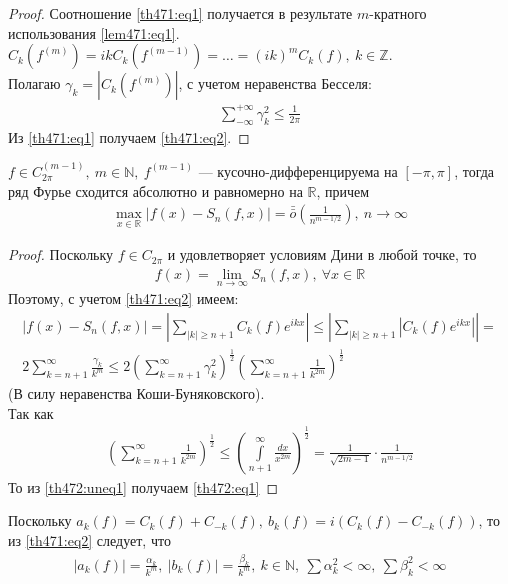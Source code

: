\begin{proof}
  Соотношение \eqref{th471:eq1} получается в результате $m$-кратного
  использования \eqref{lem471:eq1}. \\
  $C_k(f^{(m)}) = ik C_k(f^{(m-1)}) = \dots = (ik)^m C_k(f), \ k \in
  \mathbb{Z}$. \\
  Полагаю $\gamma_k = |C_k(f^{(m)})|$, с учетом неравенства Бесселя:
  \begin{gather*}
    \sum\limits_{-\infty}^{+\infty} \gamma_k^2 \leq \frac{1}{2\pi}
  \end{gather*}
  Из \eqref{th471:eq1} получаем \eqref{th471:eq2}.
\end{proof}

\begin{theorem}
  $f \in C_{2\pi}^{(m-1)}, \ m \in \mathbb{N}, \ f^{(m-1)}$ ---
  кусочно-дифференцируема на $[-\pi, \pi]$, тогда ряд Фурье сходится абсолютно
  и равномерно на $\mathbb{R}$, причем
  \begin{gather}
    \max\limits_{x \in \mathbb{R}} |f(x) - S_n(f,x)| =
    \bar{\bar{o}}\left(\frac{1}{n^{m - 1/2}}\right), \ n \to \infty
    \label{th472:eq1}
  \end{gather}
\end{theorem}

\begin{proof}
  Поскольку $f \in C_{2\pi}$ и удовлетворяет условиям Дини в любой точке, то
  \begin{gather*}
    f(x) = \lim\limits_{n \to \infty} S_n(f, x), \ \forall x \in \mathbb{R}
  \end{gather*}
  Поэтому, с учетом \eqref{th471:eq2} имеем:
  \begin{gather}
    |f(x) - S_n(f, x)| = \left|\sum\limits_{|k| \geq n + 1} C_k(f)
    e^{ikx}\right| \leq \left|\sum\limits_{|k| \geq n + 1}
    |C_k(f)e^{ikx}|\right| = \\
    2 \sum\limits_{k = n + 1}^{\infty} \frac{\gamma_k}{k^m} \leq
    2 \left(\sum\limits_{k = n + 1}^{\infty} \gamma_k^2 \right)^{\frac{1}{2}}
    \left(\sum\limits_{k = n + 1}^{\infty}  \frac{1}{k^{2m}}\right)^{\frac{1}{2}}
    \label{th472:uneq1}
  \end{gather}
  (В силу неравенства Коши-Буняковского). \\
  Так как
  \begin{gather*}
    \left(\sum\limits_{k = n + 1}^{\infty}
    \frac{1}{k^{2m}}\right)^{\frac{1}{2}} \leq \left(\int\limits_{n+1}^{\infty}
    \frac{dx}{x^{2m}} \right)^\frac{1}{2} = \frac{1}{\sqrt{2m-1}} \cdot
    \frac{1}{n^{m-1/2}}
  \end{gather*}
  То из \eqref{th472:uneq1} получаем \eqref{th472:eq1}
\end{proof}

\begin{remark}
  Поскольку $a_k(f) = C_k(f) + C_{-k}(f), \ b_k(f) = i(C_k(f) - C_{-k}(f))$, то
  из \eqref{th471:eq2} следует, что
  \begin{gather*}
    |a_k(f)| = \frac{\alpha_k}{k^m}, \ |b_k(f)| = \frac{\beta_k}{k^m}, \ k \in
    \mathbb{N}, \ \sum \alpha_k^2 < \infty, \ \sum \beta_k^2 < \infty
  \end{gather*}
\end{remark}

